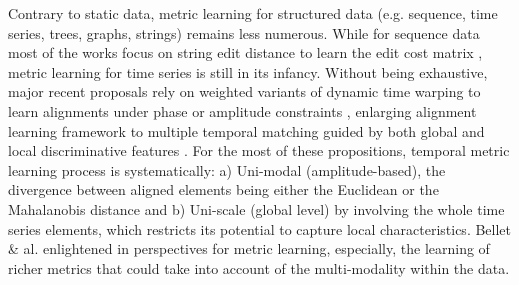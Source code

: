 Contrary to static data, metric learning for structured data (e.g. sequence, time series, trees, graphs, strings) remains less numerous. While for sequence data most of the works focus on string edit distance to learn the edit cost matrix \cite{Oncina2006,Bellet2012}, metric learning for time series is still in its infancy. Without being exhaustive, major recent proposals rely on weighted variants of dynamic time warping to learn alignments under phase or amplitude constraints \cite{Reyes2011,Jeong2011,ZhangX.-L.Z.-G.Luo2014}, enlarging alignment learning framework to multiple temporal matching guided by both global and local discriminative features \cite{Frambourg2013a}. For the most of these propositions, temporal metric learning process is systematically: a) Uni-modal (amplitude-based), the divergence between aligned elements being either the Euclidean or the Mahalanobis distance and b) Uni-scale (global level) by involving the whole time series elements, which restricts its potential to capture local characteristics. Bellet \& al. enlightened in \cite{Bellet2013a} perspectives for metric learning, especially, the learning of richer metrics that could take into account of the multi-modality within the data. 

